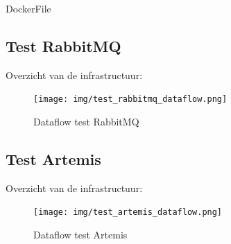 DockerFile

\subsection{Test RabbitMQ}
Overzicht van de infrastructuur:
\begin{figure}[h!]
  \centering
  \texttt{[image: img/test\_rabbitmq\_dataflow.png]}
  \caption{\label{fig:test_rabbitmq_dataflow}Dataflow test RabbitMQ}
\end{figure}

\subsection{Test Artemis}
Overzicht van de infrastructuur:
\begin{figure}[h!]
  \centering
  \texttt{[image: img/test\_artemis\_dataflow.png]}
  \caption{\label{fig:test_artemis_dataflow}Dataflow test Artemis}
\end{figure}










